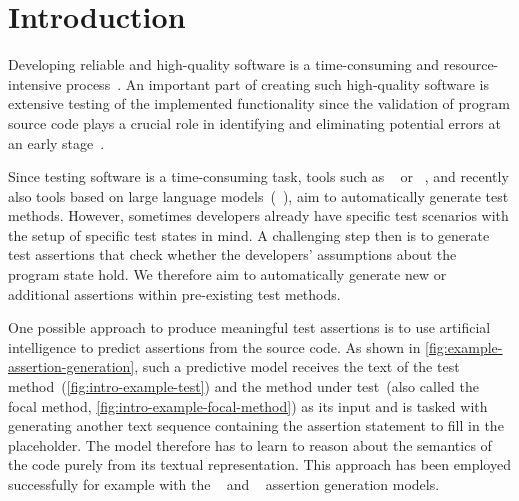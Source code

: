 
\section{Introduction}

Developing reliable and high-quality software is a time-consuming and
resource-intensive process~\cite{Yang2006}. An important part of
creating such high-quality software is extensive testing of the
implemented functionality since the validation of program source code
plays a crucial role in identifying and eliminating potential errors
at an early stage~\cite{Beck2000}.


Since testing software is a time-consuming task, tools such as
\evosuite~\cite{Fraser2011} or
~\cite{Pacheco2007}, and recently also tools based
on large language models~(\eg~\cite{Nie2023,Schaefer2024,He2024}), aim
to automatically generate test methods. However, sometimes developers
already have specific test scenarios with the setup of specific test
states in mind. A challenging step then is to generate test assertions
that check whether the developers' assumptions about the program state
hold.
We therefore aim to automatically generate new or additional
assertions within pre-existing test methods.



One possible approach to produce meaningful test assertions is to use
artificial intelligence to predict assertions from the source code. As
shown in \cref{fig:example-assertion-generation}, such a predictive
model receives the text of the test
method~(\cref{fig:intro-example-test}) and the method under test~(also
called the focal method, \cref{fig:intro-example-focal-method}) as its
input and is tasked with generating another text sequence containing
the assertion statement to fill in the placeholder. The model
therefore has to learn to reason about the semantics of the code
purely from its textual representation.
This approach has been employed successfully for example with the
\atlas~\cite{Watson2020} and \toga~\cite{Dinella2022} assertion
generation models.


